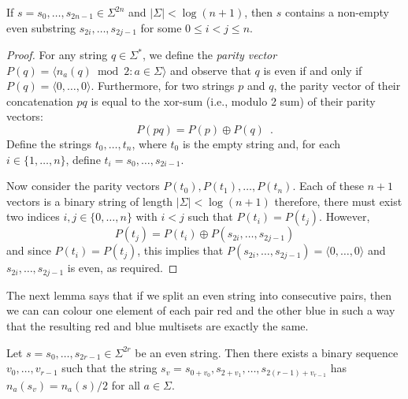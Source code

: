 \documentclass{patmorin}
\begin{document}
\begin{lem}
  If $s=s_0,\ldots,s_{2n-1}\in\Sigma^{2n}$ and $|\Sigma|< \log(n+1)$,
  then $s$ contains a non-empty even substring $s_{2i},\ldots,s_{2j-1}$
  for some $0\le i < j\le n$.
\end{lem}

\begin{proof}
  For any string $q\in\Sigma^*$, we define the \emph{parity vector}
  $P(q)=\langle n_a(q)\bmod 2: a\in\Sigma \rangle$ and observe that $q$ is
  even if and only if $P(q)=\langle 0,\ldots,0\rangle$.   Furthermore, for
  two strings $p$ and $q$, the parity vector of their concatenation $pq$
  is equal to the xor-sum (i.e., modulo 2 sum) of their parity vectors:
  \[
     P(pq) = P(p)\oplus P(q) \enspace .
  \] 
  Define the strings $t_0,\ldots,t_n$, where $t_0$ is the empty string
  and, for each $i\in\{1,\ldots,n\}$, define $t_i=s_0,\ldots,s_{2i-1}$.

  Now consider the parity vectors $P(t_0),P(t_1),\ldots,P(t_n)$.
  Each of these $n+1$ vectors is a binary string of length
  $|\Sigma| < \log(n+1)$ therefore, there must exist two indices
  $i,j\in\{0,\ldots,n\}$ with $i<j$ such that $P(t_i)=P(t_j)$.  However,
  \[
      P(t_j) = P(t_i) \oplus P(s_{2i},\ldots,s_{2j-1}) 
  \]
  and since $P(t_i)=P(t_j)$, this implies that $P(s_{2i},\ldots,s_{2j-1})=\langle0,\ldots,0\rangle$
  and $s_{2i},\ldots,s_{2j-1}$ is even, as required.
\end{proof}


The next lemma says that if we split an even string into consecutive
pairs, then we can can colour one element of each pair red and the other
blue in such a way that the resulting red and blue multisets are exactly
the same.
\begin{lem}
  Let $s=s_0,\ldots,s_{2r-1}\in\Sigma^{2r}$ be an even string. Then there
  exists a binary sequence $v_0,\ldots,v_{r-1}$ such that the string
  $s_v=s_{0+v_0},s_{2+v_1},\ldots,s_{2(r-1)+v_{r-1}}$ 
  has $n_a(s_v)=n_a(s)/2$
  for all $a\in\Sigma$.
\end{lem}
\end{document}
